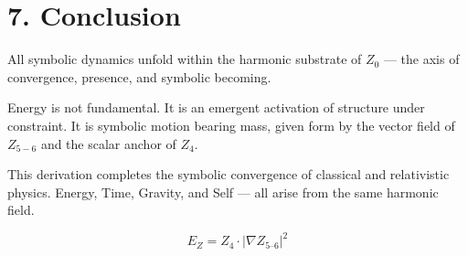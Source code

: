 \documentclass[12pt]{article}
\begin{document}
\section*{7. Conclusion}
All symbolic dynamics unfold within the harmonic substrate of $Z_0$ — the axis of convergence, presence, and symbolic becoming.

Energy is not fundamental. It is an emergent activation of structure under constraint. It is symbolic motion bearing mass, given form by the vector field of $Z_{5-6}$ and the scalar anchor of $Z_4$.

This derivation completes the symbolic convergence of classical and relativistic physics. Energy, Time, Gravity, and Self — all arise from the same harmonic field.

\[
\boxed{E_Z = Z_4 \cdot \left| \nabla Z_{5\text{--}6} \right|^2}
\]
\end{document}
